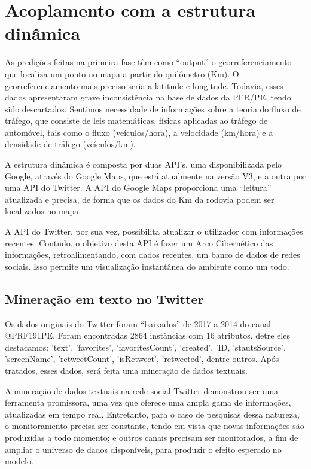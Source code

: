 \pagebreak

\section{Acoplamento com a estrutura dinâmica}

As predições feitas na primeira fase têm como ``output'' o georreferenciamento que localiza um ponto no mapa a partir do quilômetro (Km). O georreferenciamento mais preciso seria a latitude e longitude. Todavia, esses dados apresentaram grave inconsistência na base de dados da PFR/PE, tendo sido descartados. Sentimos necessidade de informações sobre a teoria do fluxo de tráfego, que consiste de leis matemáticas, físicas aplicadas ao tráfego de automóvel, tais como o fluxo (veículos/hora), a velocidade (km/hora) e a densidade de tráfego (veículos/km).

A estrutura dinâmica é composta por duas API's, uma disponibilizada pelo Google, através do Google Maps, que está atualmente na versão V3, e a
outra por uma API do Twitter. A API do Google Maps proporciona uma ``leitura'' atualizada e precisa, de forma que os dados do Km da rodovia podem ser localizados no mapa.

A API do Twitter, por sua vez, possibilita atualizar o utilizador com informações recentes. Contudo, o objetivo desta API é fazer 
um Arco Cibernético das informações, retroalimentando, com dados recentes, um banco de dados de redes sociais. Isso permite um visualização 
instantânea do ambiente como um todo.

\pagebreak

\subsection{Mineração em texto no Twitter}

Os dados originais do Twitter foram ``baixados'' de 2017 a 2014 do canal @PRF191PE. Foram encontradas 2864 instâncias com 16 atributos, detre eles destacamos: 'text', 'favorites', 'favoritesCount', 'created', 'ID, 'stautsSource', 'screenName', 'retweetCount', 'isRetweet', 'retweeted', dentre outros. Após tratados, esses dados, será feita uma mineração de dados textuais.

A mineração de dados textuais na rede social Twitter demonstrou ser uma ferramenta promissora, uma vez que oferece uma ampla gama de informações, atualizadas em tempo real. Entretanto, para o caso de pesquisas dessa natureza, o monitoramento precisa ser constante, tendo em vista que novas informações são produzidas a todo momento; e outros canais precisam ser monitorados, a fim de ampliar o universo de dados disponíveis, para produzir o efeito esperado no modelo.

